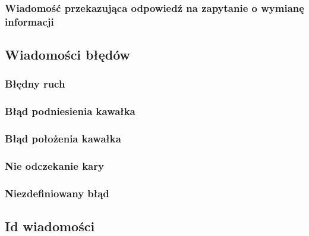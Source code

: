 \documentclass[Dokumentacja.tex]{subfiles}
\begin{document}
\subsubsection{Wiadomość przekazująca odpowiedź na zapytanie o wymianę informacji}


\subsection{Wiadomości błędów}

\subsubsection{Błędny ruch}


\subsubsection{Błąd podniesienia kawałka}


\subsubsection{Błąd położenia kawałka}


\subsubsection{Nie odczekanie kary}


\subsubsection{Niezdefiniowany błąd}


\subsection{Id wiadomości}
\end{document}
